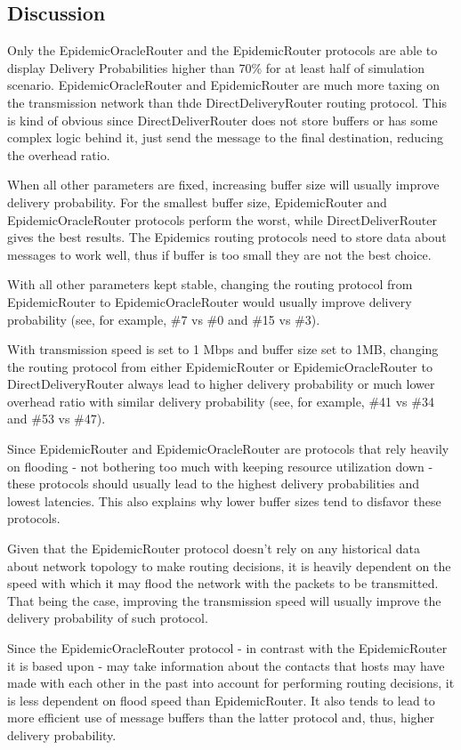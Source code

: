 \newpage

\subsection{Discussion}

Only the EpidemicOracleRouter and the EpidemicRouter protocols are able to
display Delivery Probabilities higher than 70\% for at least half of simulation
scenario. EpidemicOracleRouter and EpidemicRouter are much more taxing on the
transmission network than thde DirectDeliveryRouter routing protocol. This is
kind of obvious since DirectDeliverRouter does not store buffers or has some
complex logic behind it, just send the message to the final destination,
reducing the overhead ratio.

When all other parameters are fixed, increasing buffer size will usually
improve delivery probability. For the smallest buffer size, EpidemicRouter and
EpidemicOracleRouter protocols perform the worst, while DirectDeliverRouter
gives the best results.  The Epidemics routing protocols need to store data
about messages to work well, thus if buffer is too small they are not the best
choice.

With all other parameters kept stable, changing the routing protocol from
EpidemicRouter to EpidemicOracleRouter would usually improve delivery
probability (see, for example, \#7 vs \#0 and \#15 vs \#3).

With transmission speed is set to 1 Mbps and buffer size set to 1MB,
changing the routing protocol from either EpidemicRouter or
EpidemicOracleRouter to DirectDeliveryRouter always lead to higher delivery
probability or much lower overhead ratio with similar delivery probability
(see, for example, \#41 vs \#34 and \#53 vs \#47).

Since EpidemicRouter and EpidemicOracleRouter are protocols that rely heavily
on flooding - not bothering too much with keeping resource utilization down -
these protocols should usually lead to the highest delivery probabilities and
lowest latencies. This also explains why lower
buffer sizes tend to disfavor these protocols.

Given that the EpidemicRouter protocol doesn't rely on any historical data
about network topology to make routing decisions, it is heavily dependent on
the speed with which it may flood the network with the packets to be
transmitted. That being the case, improving the transmission speed will usually
improve the delivery probability of such protocol.

Since the EpidemicOracleRouter protocol - in contrast with the EpidemicRouter
it is based upon - may take information about the contacts that hosts may have
made with each other in the past into account for performing routing decisions,
it is less dependent on flood speed than EpidemicRouter.  It also tends to lead
to more efficient use of message buffers than the latter protocol and, thus,
higher delivery probability.
